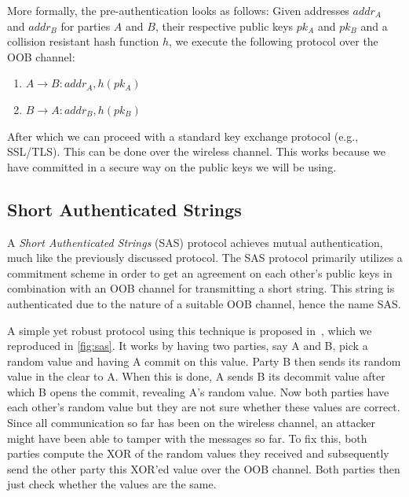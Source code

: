\documentclass[conference, 11pt]{sty/IEEEtran}
\newlength{\arrow}
\begin{document}
More formally, the pre-authentication looks as follows:
Given addresses $addr_A$ and $addr_B$ for parties $A$ and $B$, their respective public keys $pk_A$ and $pk_B$ and a collision resistant hash function $h$, we execute the following protocol over the OOB channel:

\begin{enumerate}
    \item $A \rightarrow B: addr_A, h(pk_A)$
    \item $B \rightarrow A: addr_B, h(pk_B)$
\end{enumerate}

After which we can proceed with a standard key exchange protocol (e.g., SSL/TLS).
This can be done over the wireless channel.
This works because we have committed in a secure way on the public keys we will be using.

\subsection{Short Authenticated Strings}
\label{ssec:short_authenticated_strings}

A \emph{Short Authenticated Strings} (SAS) protocol achieves mutual authentication, much like the previously discussed protocol.
The SAS protocol primarily utilizes a commitment scheme in order to get an agreement on each other's public keys in combination with an OOB channel for transmitting a short string.
This string is authenticated due to the nature of a suitable OOB channel, hence the name SAS.

A simple yet robust protocol using this technique is proposed in~\cite{pasini2006sas}, which we reproduced in \autoref{fig:sas}.
It works by having two parties, say A and B, pick a random value and having A commit on this value.
Party B then sends its random value in the clear to A.
When this is done, A sends B its decommit value after which B opens the commit, revealing A's random value.
Now both parties have each other's random value but they are not sure whether these values are correct.
Since all communication so far has been on the wireless channel, an attacker might have been able to tamper with the messages so far.
To fix this, both parties compute the XOR of the random values they received and subsequently send the other party this XOR'ed value over the OOB channel.
Both parties then just check whether the values are the same.
\end{document}
